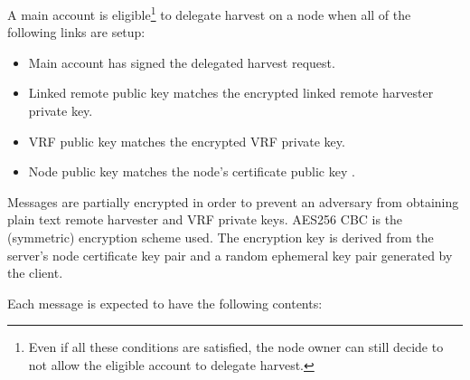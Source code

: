 A main account is eligible\footnote{
	Even if all these conditions are satisfied, the node owner can still decide to not allow the eligible account to delegate harvest.
} to delegate harvest on a node when all of the following links are setup:
\begin{itemize}
	\item{Main account has signed the delegated harvest request.}
	\item{Linked remote public key matches the encrypted linked remote harvester private key.}
	\item{VRF public key matches the encrypted VRF private key.}
	\item{Node public key matches the node's certificate public key .}
\end{itemize}

Messages are partially encrypted in order to prevent an adversary from obtaining plain text remote harvester and VRF private keys.
AES256 CBC is the (symmetric) encryption scheme used.
The encryption key is derived from the server's node certificate key pair and a random ephemeral key pair generated by the client.

Each message is expected to have the following contents:
\begin{table}[ht]
\end{table}


